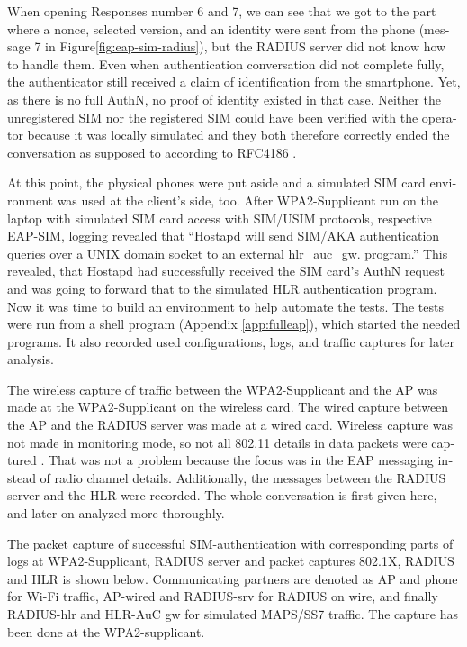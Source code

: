 \documentclass[12pt,a4paper,english]{tutthesis}
\begin{document}
\begin{otherlanguage}{english}
When opening Responses number 6 and 7, we can see that we got to the
part where a nonce, selected version, and an identity were sent from
the phone (message 7 in Figure\ref{fig:eap-sim-radius}), but the RADIUS server
did not know how to handle them.
 Even when authentication conversation did  not complete fully, the
authenticator still received a claim of identification from the
smartphone. Yet, as there is no full AuthN, no proof of identity existed in
that case.
Neither the unregistered SIM nor the registered SIM could have been
verified with the
operator because it was locally simulated and they both therefore
correctly  ended the conversation as supposed to according to RFC4186 \cite{rfc4186}.

At this point, the physical phones were put aside and a simulated SIM card
environment was used at the client's  side, too.
After WPA2-Supplicant run on the laptop with simulated SIM card access 
with SIM/USIM protocols, respective EAP-SIM, logging revealed that
``Hostapd will send SIM/AKA authentication queries over a UNIX domain socket to an external hlr\_auc\_gw.
program.''
This revealed, that Hostapd had  successfully received the SIM
card's AuthN request and was going to forward that to the simulated HLR
authentication program. Now it was time to build an
environment to help automate the tests.
The tests were run from a shell program (Appendix \ref{app:fulleap}), which
started the needed programs. It also recorded used configurations, logs,
and traffic captures for later analysis.



The wireless capture of traffic between the WPA2-Supplicant and the AP was made at
the WPA2-Supplicant on the wireless card. The wired capture between
the AP and the 
RADIUS server was made at a  wired card. Wireless capture was
not made in monitoring mode, so not all 802.11 details in
data packets were captured \cite{wireshark-capture}.
That was not a problem because the focus was 
in the EAP messaging instead of radio channel details.
Additionally, the messages between the RADIUS server and the HLR were recorded.
The whole conversation is first  given  here, and later on analyzed more
thoroughly.



The packet capture of successful SIM-authentication with corresponding
parts of logs at WPA2-Supplicant, RADIUS server and packet captures
802.1X, RADIUS and HLR is shown below.  Communicating partners are
denoted as AP and phone for Wi-Fi traffic, AP-wired and
RADIUS-srv for RADIUS on wire, and finally RADIUS-hlr and HLR-AuC gw
for simulated MAPS/SS7 traffic.
The capture has been done at the WPA2-supplicant.


\end{otherlanguage}
\end{document}
